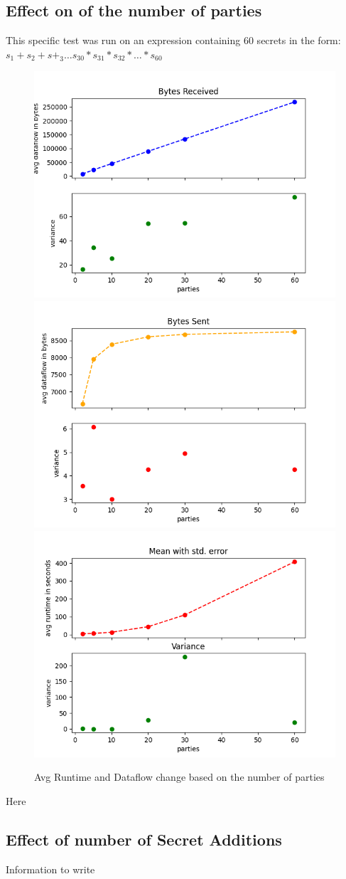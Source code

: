 \documentclass[10pt,conference,compsocconf]{IEEEtran}
\begin{document}
\subsection{Effect on of the number of parties}
This specific test was run on an expression containing 60 secrets in the form: $s_1 + s_2 + s+_3 \dots s_{30} * s_{31} *
s_{32} * \dots*  s_{60}$
\begin{figure}[ht]
    \includegraphics[width=0.49\linewidth]{../performance_analysis/dataflow_in_num_party_change.png}
    \includegraphics[width=0.49\linewidth]{../performance_analysis/dataflow_out_num_party_change.png}
    \includegraphics[width=0.49\linewidth]{../performance_analysis/runtime_num_party_change.png}
    \caption{Avg Runtime and Dataflow change based on the number of parties}
\end{figure}
Here

\pagebreak
\subsection{Effect of number of Secret Additions}
Information to write
\end{document}
